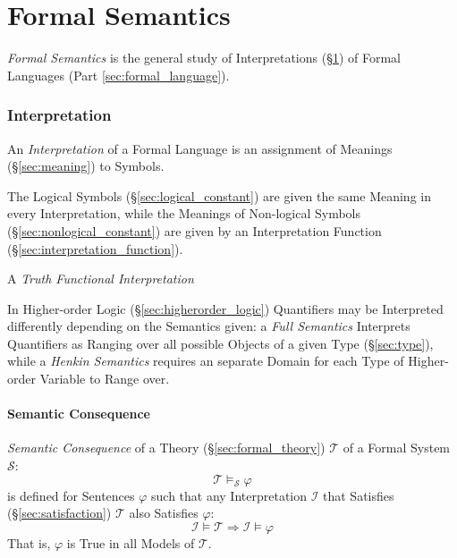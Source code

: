 \part{Formal Semantics}\label{part:formal_semantics}

\emph{Formal Semantics} is the general study of Interpretations
(\S\ref{sec:interpretation}) of Formal Languages (Part
\ref{sec:formal_language}).



\section{Interpretation}\label{sec:interpretation}

An \emph{Interpretation} of a Formal Language is an assignment of
Meanings (\S\ref{sec:meaning}) to Symbols.

The Logical Symbols (\S\ref{sec:logical_constant}) are given the same
Meaning in every Interpretation, while the Meanings of Non-logical
Symbols (\S\ref{sec:nonlogical_constant}) are given by an Interpretation
Function (\S\ref{sec:interpretation_function}).

A \emph{Truth Functional Interpretation}

In Higher-order Logic (\S\ref{sec:higherorder_logic}) Quantifiers may
be Interpreted differently depending on the Semantics given: a
\emph{Full Semantics} Interprets Quantifiers as Ranging over all
possible Objects of a given Type (\S\ref{sec:type}), while a
\emph{Henkin Semantics} requires an separate Domain for each Type of
Higher-order Variable to Range over.



\subsection{Semantic Consequence}\label{sec:semantic_consequence}

\emph{Semantic Consequence} of a Theory (\S\ref{sec:formal_theory})
$\mathcal{T}$ of a Formal System $\mathcal{S}$:
\[
  \mathcal{T} \vDash_{\mathcal{S}} \varphi
\]
is defined for Sentences $\varphi$ such that any Interpretation
$\mathcal{I}$ that Satisfies (\S\ref{sec:satisfaction}) $\mathcal{T}$
also Satisfies $\varphi$:
\[
  \mathcal{I} \models \mathcal{T}
  \Rightarrow \mathcal{I} \models \varphi
\]
That is, $\varphi$ is True in all Models of $\mathcal{T}$.


